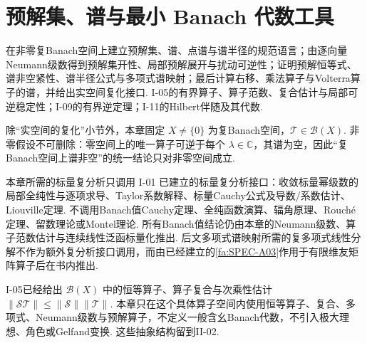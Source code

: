 \chapter{预解集、谱与最小 Banach 代数工具}\label{chap:I-12}
\FAChapterOpening
{在非零复Banach空间上建立预解集、谱、点谱与谱半径的规范语言；由逐向量Neumann级数得到预解集开性、局部预解展开与扰动可逆性；证明预解恒等式、谱非空紧性、谱半径公式与多项式谱映射；最后计算右移、乘法算子与Volterra算子的谱，并给出实空间复化接口.}
{I-05的有界算子、算子范数、复合估计与局部可逆稳定性；I-09的有界逆定理；I-11的Hilbert伴随及其代数.}
{\begin{center}
\end{center}}

除“实空间的复化”小节外，本章固定 \(\displaystyle X\neq\{0\}\) 为复Banach空间，\(\displaystyle \mathcal T\in\mathcal B(X)\). 非零假设不可删除：零空间上的唯一算子可逆于每个 \(\displaystyle \lambda\in\mathbb C\)，其谱为空，因此“复Banach空间上谱非空”的统一结论只对非零空间成立.

\begin{FARemark}[标量复分析前置接口]\label{i12:scalar-complex-interface}
本章所需的标量复分析只调用 I-01 已建立的标量复分析接口：收敛标量幂级数的局部全纯性与逐项求导、Taylor系数解释、标量Cauchy公式及导数/系数估计、Liouville定理. 不调用Banach值Cauchy定理、全纯函数演算、辐角原理、Rouché定理、留数理论或Montel理论. 所有Banach值结论仍由本章的Neumann级数、算子范数估计与连续线性泛函标量化推出. 后文多项式谱映射所需的复多项式线性分解不作为额外复分析接口调用，而由已经建立的\autoref{fa:SPEC-A03}作用于有限维友矩阵算子后在书内推出.
\end{FARemark}

\begin{FARemark}[本章的乘法边界]
I-05已经给出 \(\displaystyle \mathcal B(X)\) 中的恒等算子、算子复合与次乘性估计
\(\displaystyle \|\mathcal S\mathcal T\| \leqslant \|\mathcal S\|\|\mathcal T\|\).
本章只在这个具体算子空间内使用恒等算子、复合、多项式、Neumann级数与预解算子，不定义一般含幺Banach代数，不引入极大理想、角色或Gelfand变换. 这些抽象结构留到II-02.
\end{FARemark}

